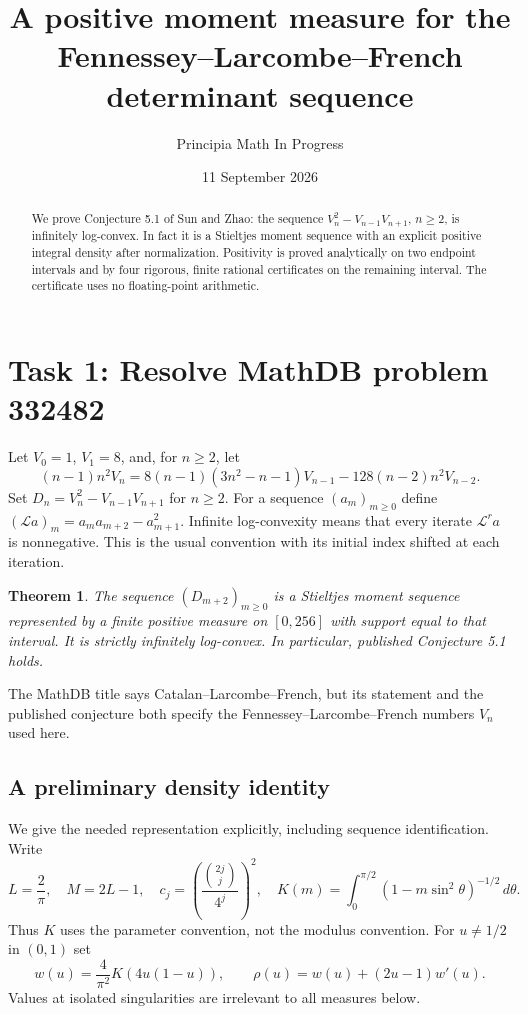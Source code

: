 \documentclass[11pt]{article}
\title{A positive moment measure for the\\
Fennessey--Larcombe--French determinant sequence}
\author{Principia Math In Progress}
\date{11 September 2026}
\newtheorem{theorem}{Theorem}
\begin{document}
\maketitle
\begin{abstract}
We prove Conjecture 5.1 of Sun and Zhao: the sequence
$V_n^2-V_{n-1}V_{n+1}$, $n\geq2$, is infinitely log-convex.
In fact it is a Stieltjes moment sequence with an explicit positive
integral density after normalization. Positivity is proved analytically
on two endpoint intervals and by four rigorous, finite rational
certificates on the remaining interval. The certificate uses no
floating-point arithmetic.
\end{abstract}

\section*{Task 1: Resolve MathDB problem 332482}
Let $V_0=1$, $V_1=8$, and, for $n\geq2$, let
\begin{equation}\label{eq:Vrec}
 (n-1)n^2V_n
 =8(n-1)(3n^2-n-1)V_{n-1}-128(n-2)n^2V_{n-2}.
\end{equation}
Set $D_n=V_n^2-V_{n-1}V_{n+1}$ for $n\geq2$.
For a sequence $(a_m)_{m\geq0}$ define
$(\mathcal La)_m=a_ma_{m+2}-a_{m+1}^2$.
Infinite log-convexity means that every iterate $\mathcal L^r a$
is nonnegative. This is the usual convention with its initial index
shifted at each iteration.

\begin{theorem}\label{thm:main}
The sequence $(D_{m+2})_{m\geq0}$ is a Stieltjes moment sequence
represented by a finite positive measure on $[0,256]$ with support
equal to that interval. It is strictly infinitely log-convex.
In particular, published Conjecture 5.1 \cite[p.~601]{source} holds.
\end{theorem}

The MathDB title says Catalan--Larcombe--French, but its statement and
the published conjecture both specify the Fennessey--Larcombe--French
numbers $V_n$ used here.

\subsection*{A preliminary density identity}
We give the needed representation explicitly, including sequence
identification. Write
\[
 L=\frac2\pi,\quad M=2L-1,\quad
 c_j=\left(\frac{\binom{2j}j}{4^j}\right)^2,\quad
 K(m)=\int_0^{\pi/2}(1-m\sin^2\theta)^{-1/2}\,d\theta.
\]
Thus $K$ uses the parameter convention, not the modulus convention.
For $u\ne1/2$ in $(0,1)$ set
\begin{equation}\label{eq:rho}
 w(u)=\frac4{\pi^2}K(4u(1-u)),\qquad
 \rho(u)=w(u)+(2u-1)w'(u).
\end{equation}
Values at isolated singularities are irrelevant to all measures below.
\end{document}
